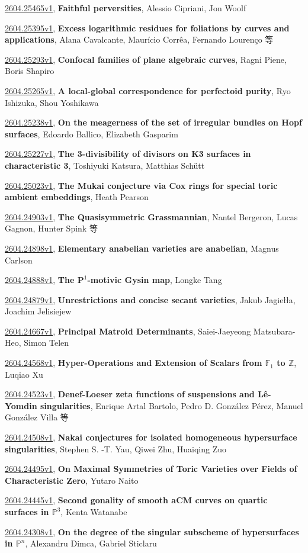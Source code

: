 \documentclass[9pt, a4paper]{article}
\theoremstyle{plain}
\theoremstyle{definition}
\theoremstyle{remark}
\newcommand{\arxiv}[3]{\href{https://arxiv.org/abs/#1}{#1}, \textbf{\textcolor{arxivblue}{#2}}, #3}
\begin{document}
\arxiv{2604.25465v1}{Faithful perversities}{Alessio Cipriani, Jon Woolf}

\arxiv{2604.25395v1}{Excess logarithmic residues for foliations by curves and applications}{Alana Cavalcante, Maurício Corrêa, Fernando Lourenço 等}

\arxiv{2604.25293v1}{Confocal families of plane algebraic curves}{Ragni Piene, Boris Shapiro}

\arxiv{2604.25265v1}{A local-global correspondence for perfectoid purity}{Ryo Ishizuka, Shou Yoshikawa}

\arxiv{2604.25238v1}{On the meagerness of the set of irregular bundles on Hopf surfaces}{Edoardo Ballico, Elizabeth Gasparim}

\arxiv{2604.25227v1}{The 3-divisibility of divisors on K3 surfaces in characteristic 3}{Toshiyuki Katsura, Matthias Schütt}

\arxiv{2604.25023v1}{The Mukai conjecture via Cox rings for special toric ambient embeddings}{Heath Pearson}

\arxiv{2604.24903v1}{The Quasisymmetric Grassmannian}{Nantel Bergeron, Lucas Gagnon, Hunter Spink 等}

\arxiv{2604.24898v1}{Elementary anabelian varieties are anabelian}{Magnus Carlson}

\arxiv{2604.24888v1}{The $\mathbf{P}^1$-motivic Gysin map}{Longke Tang}

\arxiv{2604.24879v1}{Unrestrictions and concise secant varieties}{Jakub Jagiełła, Joachim Jelisiejew}

\arxiv{2604.24667v1}{Principal Matroid Determinants}{Saiei-Jaeyeong Matsubara-Heo, Simon Telen}

\arxiv{2604.24568v1}{Hyper-Operations and Extension of Scalars from $\mathbb{F}_1$ to $\mathbb{Z}$}{Luqiao Xu}

\arxiv{2604.24523v1}{Denef-Loeser zeta functions of suspensions and Lê-Yomdin singularities}{Enrique Artal Bartolo, Pedro D. González Pérez, Manuel González Villa 等}

\arxiv{2604.24508v1}{Nakai conjectures for isolated homogeneous hypersurface singularities}{Stephen S. -T. Yau, Qiwei Zhu, Huaiqing Zuo}

\arxiv{2604.24495v1}{On Maximal Symmetries of Toric Varieties over Fields of Characteristic Zero}{Yutaro Naito}

\arxiv{2604.24445v1}{Second gonality of smooth aCM curves on quartic surfaces in $\mathbb{P}^3$}{Kenta Watanabe}

\arxiv{2604.24308v1}{On the degree of the singular subscheme of hypersurfaces in ${\mathbb P}^n$}{Alexandru Dimca, Gabriel Sticlaru}
\end{document}
